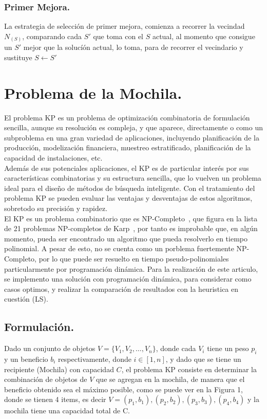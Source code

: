 \documentclass{ci5652}
\begin{document}
		\subsubsection{Primer Mejora.}
			La estrategia de selección de primer mejora, comienza a recorrer la vecindad $N_(S)$, comparando cada $S'$ que toma con el $S$ actual, al momento que consigue un $S'$ mejor que la solucíón actual, lo toma, para de recorrer el vecindario y sustituye $S \leftarrow S'$	
	
\section{Problema de la Mochila.}
	El problema KP es un problema de optimización combinatoria de formulación sencilla, aunque su resolución es compleja, y que aparece, directamente o como un subproblema en una gran variedad de aplicaciones, incluyendo  planificación de la producción, modelización financiera, muestreo estratificado, planificación de la capacidad de instalaciones, etc.\\
	Además de sus potenciales aplicaciones, el KP es de particular interés por sus características combinatorias y su estructura sencilla, que lo vuelven un problema ideal para el diseño de métodos de búsqueda inteligente. Con el tratamiento del problema KP se pueden evaluar las ventajas y desventajas de estos algoritmos, sobretodo su precisión y rapidez.\\
	El KP es un problema combinatorio que es NP-Completo~\cite{c_KP_01}, que figura en la lista de 21 problemas NP-completos de Karp~\cite{c_KP_04}, por tanto es improbable que, en algún momento, pueda ser encontrado un algoritmo que pueda resolverlo en tiempo polinomial. A pesar de esto, no se cuenta como un porblema fuertemente NP-Completo, por lo que puede ser resuelto en tiempo pseudo-polinomiales particularmente por programación dinámica. Para la realización de este articulo, se implemento una solución con programación dinámica, para considerar como casos optimos, y realizar la comparación de resultados con la heuristica en cuestión (LS). 
	
	\subsection{Formulación.}
	Dado un conjunto de objetos $V = \{ V_1,V_2,\ldots,V_n \}$, donde cada $V_i$ tiene un peso $p_i$ y un beneficio $b_i$ respectivamente, donde $i \in [1,n]$, y dado que se tiene un recipiente (Mochila) con capacidad $C$, el problema KP consiste en determinar la combinación de objetos de $V$ que se agregan en la mochila, de manera que el beneficio obtenido sea el máximo posible, como se puede ver en la Figura 1, donde se tienen 4 items, es decir $V = {(p_1,b_1),(p_2,b_2),(p_3,b_3),(p_4,b_4)}$ y la mochila tiene una capacidad total de C.
\end{document}
